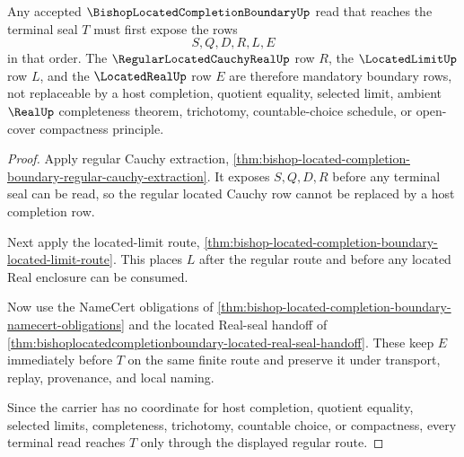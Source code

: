\begin{theorem}
\label{thm:bishop-located-completion-boundary-regular-route}
Any accepted $\BishopLocatedCompletionBoundaryUp$ read that reaches the terminal seal $T$ must first expose the rows
$$
S,Q,D,R,L,E
$$
in that order. The $\RegularLocatedCauchyRealUp$ row $R$, the $\LocatedLimitUp$ row $L$, and the $\LocatedRealUp$ row $E$ are therefore mandatory boundary rows, not replaceable by a host completion, quotient equality, selected limit, ambient $\RealUp$ completeness theorem, trichotomy, countable-choice schedule, or open-cover compactness principle.
\end{theorem}
\begin{proof}
Apply regular Cauchy extraction, \autoref{thm:bishop-located-completion-boundary-regular-cauchy-extraction}. It exposes $S,Q,D,R$ before any terminal seal can be read, so the regular located Cauchy row cannot be replaced by a host completion row.

Next apply the located-limit route, \autoref{thm:bishop-located-completion-boundary-located-limit-route}. This places $L$ after the regular route and before any located Real enclosure can be consumed.

Now use the NameCert obligations of \autoref{thm:bishop-located-completion-boundary-namecert-obligations} and the located Real-seal handoff of \autoref{thm:bishoplocatedcompletionboundary-located-real-seal-handoff}. These keep $E$ immediately before $T$ on the same finite route and preserve it under transport, replay, provenance, and local naming.

Since the carrier has no coordinate for host completion, quotient equality, selected limits, completeness, trichotomy, countable choice, or compactness, every terminal read reaches $T$ only through the displayed regular route.
\end{proof}

